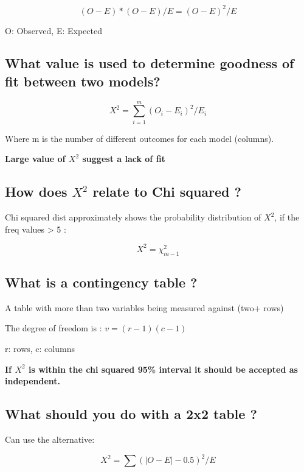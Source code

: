 \documentclass[11pt]{scrartcl} %
\begin{document}
\begin{equation}
	(O-E) * (O-E)/E = (O-E)^2/E
\end{equation}

O: Observed, E: Expected

\subsection{What value is used to determine goodness of fit between
two
models?}

\begin{equation}
	X^2 = \sum^{m}_{i=1} (O_i - E_i)^2/E_i
\end{equation}

Where m is the number of different outcomes for each model (columns).

\textbf{Large value of \(X^2\) suggest a lack of fit}

\subsection{\texorpdfstring{How does \(X^2\) relate to Chi squared
?}{How does X\^{}2 relate to Chi squared ?}}

Chi squared dist approximately shows the probability distribution of
\(X^2\), if the freq values \textgreater{} 5 :

\begin{equation}
	X^2 = \chi^2_{m-1}
\end{equation}

\subsection{What is a contingency table
?}

A table with more than two variables being measured against (two+ rows)

The degree of freedom is : \(v= (r-1)(c-1)\)

r: rows, c: columns

\textbf{If \(X^2\) is within the chi squared 95\% interval it should be
accepted as independent.}

\subsection{What should you do with a 2x2 table
?}

Can use the alternative:

\begin{equation}
	X^2 = \sum (|O-E|-0.5)^2/E
\end{equation}
\end{document}
